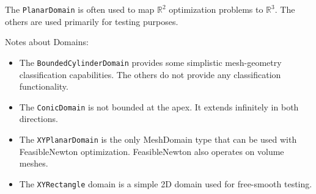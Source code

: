 The \texttt{PlanarDomain} is often used to map $\mathbb{R}^{2}$ optimization
problems to $\mathbb{R}^{3}$.  The others are used primarily for testing
purposes.  

\medskip
\noindent Notes about Domains:
\begin{itemize}
\item The \texttt{BoundedCylinderDomain} provides some simplistic
mesh-geometry classification capabilities.  The others do not provide any
classification functionality. 
\item The \texttt{ConicDomain} is not bounded at the apex.
It extends infinitely in  both directions.
\item The \texttt{XYPlanarDomain} is the only MeshDomain type that can be used with FeasibleNewton optimization.  FeasibleNewton also operates on volume meshes. 
\item The \texttt{XYRectangle} domain is a simple 2D domain used for free-smooth testing.
\end{itemize}
   
